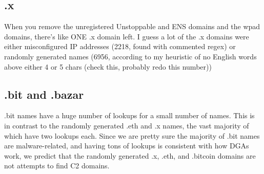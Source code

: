 \subsection{.x}

When you remove the unregistered Unstoppable and ENS domains and the wpad 
domains, there’s like ONE .x domain left. I guess a lot of the .x domains were 
either misconfigured IP addresses (2218, found with 
commented regex) or randomly generated names (6956, according to my heuristic 
of no English words above either 4 or 5 chars (check this, probably redo this 
number)) %

\subsection{.bit and .bazar}

.bit names have a huge number of lookups for a small number of names. This is 
in contrast to the randomly generated .eth and .x names, the vast majority of 
which have two lookups each. Since we are pretty sure the majority of .bit 
names are malware-related, and having tons of lookups is consistent with how 
DGAs work, we predict that the randomly generated .x, .eth, and .bitcoin 
domains are not attempts to find C2 domains.



%	
%	
